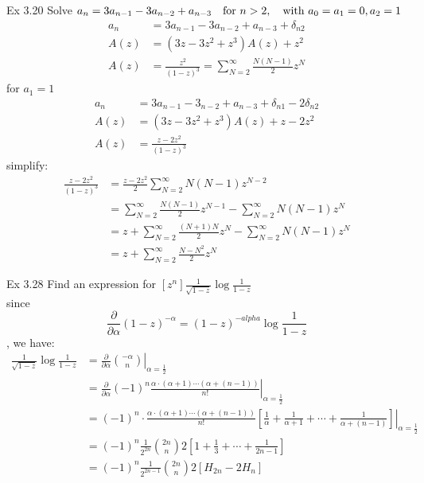 \documentclass{article}
\newcommand{\evalAt}[3]{\ensuremath{\left.#1\right\vert_{#2 = #3}}}
\begin{document}
Ex 3.20 Solve $a_n=3a_{n-1}-3a_{n-2}+a_{n-3}\quad\hbox{for $n>2$},\quad\hbox{with $a_0 = a_1 = 0,a_2 = 1$}$\\
\begin{align*}
    a_n &= 3a_{n-1} - 3a_{n-2} + a_{n-3} + \delta_{n2}\\
    A(z) &= (3z-3z^2 + z^3)A(z) + z^2\\
    A(z) &= \frac{z^2}{(1-z)^3} = \sum_{N=2}^{\infty}\frac{N(N-1)}{2}z^N
\end{align*}
for $a_1=1$
\begin{align*}
    a_n &= 3a_{n-1} - 3_{n-2} + a_{n-3} + \delta_{n1} - 2\delta_{n2}\\
    A(z) &= (3z - 3z^2 + z^3)A(z) + z - 2z^2\\
    A(z) &= \frac{z - 2z^2}{(1-z)^3}
\end{align*}
simplify:
\begin{align*}
    \frac{z - 2z^2}{(1-z)^3} &= \frac{z - 2z^2}{2} \sum_{N = 2}^{\infty}N(N-1)z^{N-2} \\
    &= \sum_{N=2}^{\infty}\frac{N(N-1)}{2}z^{N-1} - \sum_{N=2}^{\infty}N(N-1)z^N \\
    &= z + \sum_{N = 2}^{\infty}\frac{(N+1)N}{2}z^N - \sum_{N=2}^{\infty}N(N-1)z^N\\
    &= z + \sum_{N = 2}^{\infty} \frac{N-N^2}{2}z^N
\end{align*}

Ex 3.28 Find an expression for $[z^n]\frac{1}{\sqrt{1-z}}\log\frac{1}{1-z}$\\
since 
\[\frac{\partial}{\partial\alpha}(1-z)^{-\alpha} = (1-z)^{-alpha} \log \frac{1}{1-z}\], we have:
\begin{align*}
    [z^n]\frac{1}{\sqrt{1-z}}\log\frac{1}{1-z} &= \left.\frac{\partial}{\partial\alpha}\binom{-\alpha}{n}\right\vert_{\alpha = \frac{1}{2}}\\
    &= \evalAt{\frac{\partial}{\partial\alpha}(-1)^n\frac{\alpha \cdot (\alpha + 1) \cdots (\alpha + (n-1))}{n!}}{\alpha}{\frac{1}{2}}\\
    &= \evalAt{(-1)^n \cdot \frac{\alpha \cdot (\alpha + 1) \cdots (\alpha + (n-1))}{n!} [\frac{1}{\alpha}+ \frac{1}{\alpha+1}+\cdots+\frac{1}{\alpha+(n-1)}]}{\alpha}{\frac{1}{2}}\\
    &= (-1)^n \frac{1}{2^{2n}}\binom{2n}{n} 2 [1 + \frac{1}{3} + \cdots + \frac{1}{2n - 1}]\\
    &= (-1)^n \frac{1}{2^{2n-1}}\binom{2n}{n} 2 [H_{2n} - 2 H_n]
\end{align*}
\end{document}
